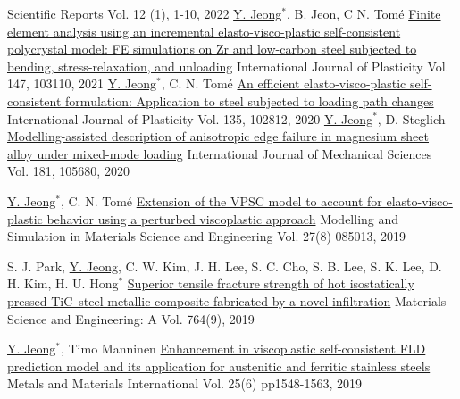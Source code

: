 \begin{cventries}
  {Scientific Reports}
  {Vol. 12 (1), 1-10, 2022}
  {
  }
  \cventry
  {\underline{Y. Jeong}$^*$, B. Jeon, C N. Tom\'{e}}
  {\href{https://doi.org/10.1016/j.ijplas.2021.103110}{Finite element analysis using an incremental elasto-visco-plastic self-consistent polycrystal model: FE simulations on Zr and low-carbon steel subjected to bending, stress-relaxation, and unloading}}
  {International Journal of Plasticity}
  {Vol. 147, 103110, 2021}
  {
  }
  \cventry
  {\underline{Y. Jeong}$^*$, C. N. Tom\'{e}}
  {\href{https://doi.org/10.1016/j.ijplas.2020.102812}{An efficient elasto-visco-plastic self-consistent formulation: Application to steel subjected to loading path changes}}
  {International Journal of Plasticity}
  {Vol. 135, 102812, 2020}
  {
  }
  \cventry
  {\underline{Y. Jeong}$^*$, D. Steglich}
  {\href{https://doi.org/10.1016/j.ijmecsci.2020.105680}{Modelling-assisted description of anisotropic edge failure in magnesium sheet alloy under mixed-mode loading}}
  {International Journal of Mechanical Sciences}
  {Vol. 181, 105680, 2020}
  {
  }

  \cventry
  {\underline{Y. Jeong}$^*$, C. N. Tom\'{e}}
  {\href{https://doi.org/10.1088/1361-651X/ab4b66}{Extension of the VPSC model to account for elasto-visco-plastic behavior using a perturbed viscoplastic approach}}
  {Modelling and Simulation in Materials Science and Engineering}
  {Vol. 27(8) 085013, 2019}
  {
  }

  \cventry
  {S. J. Park, \underline{Y. Jeong}, C. W. Kim, J. H. Lee, S. C. Cho, S. B. Lee, S. K. Lee, D. H. Kim, H. U. Hong$^*$}
  {\href{https://doi.org/10.1016/j.msea.2019.138260}{Superior tensile fracture strength of hot isostatically pressed TiC–steel metallic composite fabricated by a novel infiltration}}
  {Materials Science and Engineering: A}
  {Vol. 764(9), 2019}
  {
  }

  \cventry
  {\underline{Y. Jeong}$^*$, Timo Manninen}
  {\href{https://doi.org/10.1007/s12540-019-00292-5}{Enhancement in viscoplastic self-consistent FLD prediction model and its application for austenitic and ferritic stainless steels}}
  {Metals and Materials International}
  {Vol. 25(6) pp1548-1563, 2019}
  {
  }


\end{cventries}
